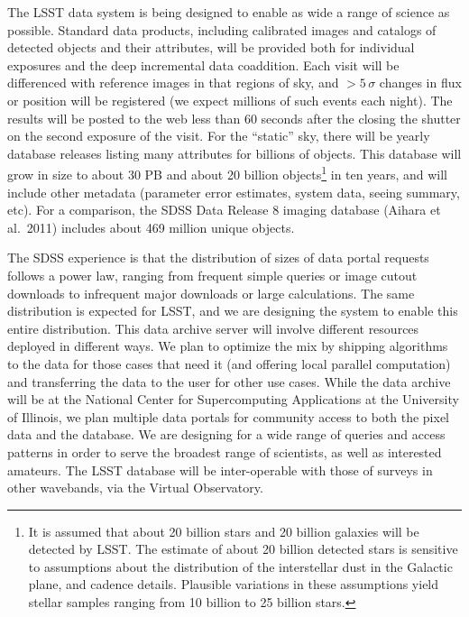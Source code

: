 \documentclass{emulateapj}
\begin{document}
The LSST data system is being designed to enable as wide a range of science as 
possible. Standard data products, including calibrated images and catalogs of
detected objects and their attributes, will be provided both for individual 
exposures and the deep incremental data coaddition.  Each visit will
be differenced with reference images in that regions of sky, and
$>5\,\sigma$ changes in flux or position will be registered (we expect
millions of such events each night).  The results will be posted to
the web less than 60 seconds after the closing the shutter on the
second exposure of the visit.  
For the ``static'' sky, there will be yearly database releases listing many 
attributes for billions of objects. This database will grow in size to about 
30 PB and about 20 billion objects\footnote{It is assumed that about 20 billion stars
and 20 billion galaxies will be detected by LSST. The estimate of about 20 billion
detected stars is sensitive to assumptions about the distribution of the 
interstellar dust in the Galactic plane, and cadence details. Plausible variations
in these assumptions yield stellar samples 
ranging from 10 billion to 25 billion stars.} in ten years, and will 
include other metadata (parameter error estimates, system data, seeing
summary, etc). For a comparison, the SDSS Data Release 8 imaging database
(Aihara et al.~2011) includes about 469 million unique objects.


The SDSS experience is that the distribution of sizes of data portal requests 
follows a power law, ranging from frequent simple queries or image cutout
downloads to infrequent major downloads or large calculations. The same 
distribution is expected for LSST, and we are designing the system to enable this 
entire distribution. This data archive server will involve different resources deployed 
in different ways. We plan to optimize the mix by shipping algorithms to the data 
for those cases that need it (and offering local parallel computation) and 
transferring the data to the user for other use cases. While the data archive will 
be at the National Center for Supercomputing Applications at the University of
Illinois, we plan multiple data portals for community access to both the 
pixel data and the database. We are designing for a wide range of queries and 
access patterns in order to serve the broadest range of scientists, as well as 
interested amateurs. The LSST database will be inter-operable with those of 
surveys in other wavebands, via the Virtual Observatory. 
\end{document}
